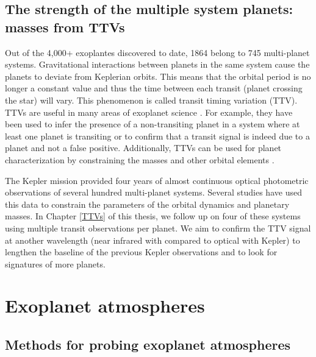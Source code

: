 
\subsection{The strength of the multiple system planets: masses from TTVs}%

Out of the 4,000+ exoplantes discovered to date, 1864 belong to 745 multi-planet systems. Gravitational interactions between planets in the same system cause the planets to deviate from Keplerian orbits. This means that the orbital period is no longer a constant value and thus the time between each transit (planet crossing the star) will vary. This phenomenon is called transit timing variation (TTV). TTVs are useful in many areas of exoplanet science \citep[e.g.,][]{Schneider2003, Agol2005, Holman2005}. For example, they have been used to infer the presence of a non-transiting planet in a system where at least one planet is transiting or to confirm that a transit signal is indeed due to a planet and not a false positive. Additionally, TTVs can be used for planet characterization by constraining the masses and other orbital elements \citep[e.g.,][]{Ballard2011, Holman2010, Carter2012}.

 The Kepler mission provided four years of almost continuous optical photometric observations of several hundred multi-planet systems. Several studies have used this data to constrain the parameters of the orbital dynamics and planetary masses. In Chapter \ref{TTVs} of this thesis, we follow up on four of these systems using multiple transit observations per planet. We aim to confirm the TTV signal at another wavelength (near infrared with \spitzerIRAC compared to optical with Kepler) to lengthen the baseline of the previous Kepler observations and to look for signatures of more planets.

\section{Exoplanet atmospheres}
\subsection{Methods for probing exoplanet atmospheres}%

